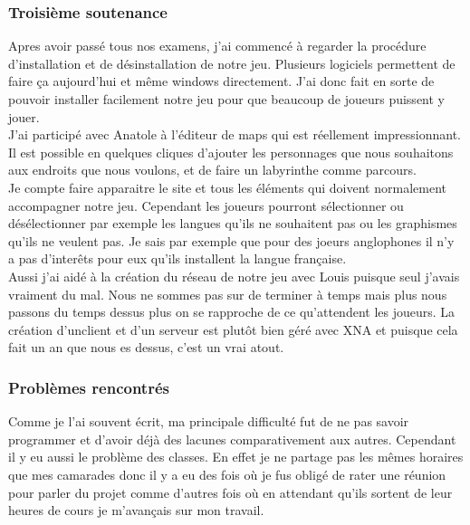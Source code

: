 \documentclass[12pt]{article}
\begin{document}
\newpage
\subsubsection{Troisième soutenance} 

Apres avoir passé tous nos examens, j'ai commencé à regarder la procédure d'installation et de désinstallation de notre jeu. Plusieurs logiciels permettent de faire ça aujourd'hui et même windows directement. J'ai donc fait en sorte de pouvoir installer facilement notre jeu pour que beaucoup de joueurs puissent y jouer.\\

J’ai participé avec Anatole à l’éditeur de  maps qui est réellement impressionnant. Il est possible en quelques cliques d’ajouter les personnages que nous souhaitons aux endroits que nous voulons, et de faire un labyrinthe  comme parcours.\\

Je compte  faire apparaitre le site et tous les éléments qui doivent normalement accompagner notre jeu. Cependant les joueurs pourront sélectionner ou désélectionner par exemple les langues qu’ils ne souhaitent pas ou les graphismes qu’ils ne veulent pas. Je sais par exemple que pour des joeurs anglophones il n'y a pas d'interêts pour eux qu'ils installent la langue française.\\

Aussi j'ai aidé à la création du réseau de notre jeu avec Louis puisque seul j'avais vraiment du mal. Nous ne sommes pas sur de terminer à temps mais plus nous passons du temps dessus plus on se rapproche de ce qu'attendent les joueurs. La création d'unclient et d'un serveur est plutôt bien géré avec XNA et puisque cela fait un an que nous es dessus, c'est un vrai atout.\\

\newpage
\subsubsection{Problèmes rencontrés}

Comme je l’ai souvent écrit, ma principale difficulté fut de ne pas savoir programmer et d’avoir déjà des lacunes comparativement aux autres. Cependant il y eu aussi le problème des classes. En effet je ne partage pas les mêmes horaires que mes camarades donc il y a eu des fois où je fus obligé de rater une réunion pour parler du projet comme d’autres fois où en attendant qu’ils sortent de leur heures de cours je m’avançais sur mon travail.\\
\end{document}

